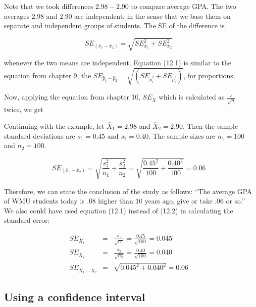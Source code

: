 \documentclass[11pt, chapterprefix=true]{scrbook}\usepackage[]{graphicx}\usepackage[]{color}
\begin{document}
Note that we took differences $2.98 - 2.90$ to compare average GPA.  The two averages 2.98 and 2.90 are independent, in the sense that we base them on separate and independent groups of students.  The SE of the difference is

\begin{equation}
SE_{(\bar{x}_1 - \bar{x}_2)} = \sqrt{SE_{\bar{x}_1}^2 + SE_{\bar{x}_2}^2 }
\end{equation}

whenever the two means are independent.  Equation (12.1) is similar to the equation from chapter 9, the $SE_{\hat{p}_1 - \hat{p}_2} = \sqrt{(SE_{\hat{p}_1^2} + SE_{\hat{p}_2^2 })}$, for proportions. 

Now, applying the equation from chapter 10, $SE_{\bar{X}}$ which is calculated as $\frac{s}{\sqrt{n}}$ twice, we get


Continuing with the example, let $\bar{X}_1  = 2.98$ and $\bar{X}_2  = 2.90$.  Then the sample standard deviations are $s_1 = 0.45$ and $s_2 = 0.40$.   The sample sizes are $n_1 = 100$ and $n_2 = 100$.

\begin{equation*}
SE_{(\bar{x}_1 - \bar{x}_2)} = \sqrt{\frac{s_1^2}{n_1}  + \frac{s_2^2}{n_2} } = \sqrt{\frac{0.45^2}{100}  + \frac{0.40^2}{100} } = 0.06
\end{equation*}

Therefore, we can state the conclusion of the study as follows: ``The average GPA of WMU students today is .08 higher than 10 years ago, give or take .06 or so.'' We also could have used equation (12.1) instead of (12.2) in calculating the standard error:

\begin{eqnarray*}
SE_{\bar{X}_1} &=& \frac{s_1}{\sqrt{n_1}} = \frac{0.45}{\sqrt{100}} = 0.045 \\
SE_{\bar{X}_2} &=& \frac{s_2}{\sqrt{n_2}} = \frac{0.40}{\sqrt{100}} = 0.040 \\
SE_{\bar{X}_1 - \bar{X}_2} &=& \sqrt{0.045^2 + 0.040^2} = 0.06 
\end{eqnarray*}

\subsection{Using a confidence interval}
\end{document}
